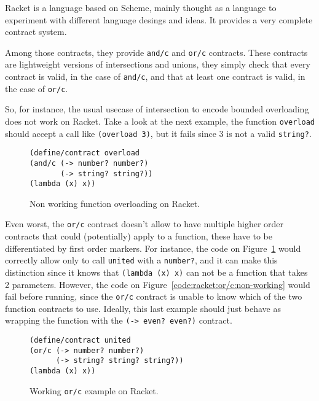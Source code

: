 \documentclass[sigplan,10pt,review,anonymous]{acmart}
\newcommand{\racket}[1]{\lstinline[language=racket]{#1}}
\begin{document}
Racket is a language based on Scheme, mainly thought as a language to experiment
with different language desings and ideas. It provides a very complete contract
system\cite{RacketContracts}.

Among those contracts, they provide \racket{and/c} and \racket{or/c} contracts.
These contracts are lightweight versions of intersections and unions, they simply
check that every contract is valid, in the case of \racket{and/c},
and that at least one contract
is valid, in the case of \racket{or/c}.

So, for instance, the usual usecase of intersection to encode bounded overloading
does not work on Racket. Take a look at the next example, the function
\racket{overload} should accept a call like \racket{(overload 3)}, but it fails
since 3 is not a valid \racket{string?}.

\begin{figure}[h]
 
\begin{lstlisting}[language=racket]
(define/contract overload
(and/c (-> number? number?)
       (-> string? string?))
(lambda (x) x))
\end{lstlisting}
\caption{Non working function overloading on Racket.}

\end{figure}

Even worst, the \racket{or/c} contract doesn't allow to have multiple higher order
contracts that could (potentially) apply to a function, these have to be
differentiated by first order markers.
For instance, the code on Figure~\ref{code:racket:or/c:working}
would correctly allow only to call
\racket{united} with a \racket{number?},
and it can make this distinction since it knows that
\racket{(lambda (x) x)} can not be a function that takes 2 parameters.
However, the code on Figure~\ref{code:racket:or/c:non-working} would fail
before running, since the \racket{or/c} contract is unable to know
which of the two function contracts to use.
Ideally, this last example should just behave as wrapping
the function with the \racket{(-> even? even?)} contract.

\begin{figure}[h]
  
\begin{lstlisting}[language=racket]
(define/contract united
(or/c (-> number? number?)
      (-> string? string? string?))
(lambda (x) x))
\end{lstlisting}
\caption{Working \racket{or/c} example on Racket.}
\label{code:racket:or/c:working}

\end{figure}
\end{document}
